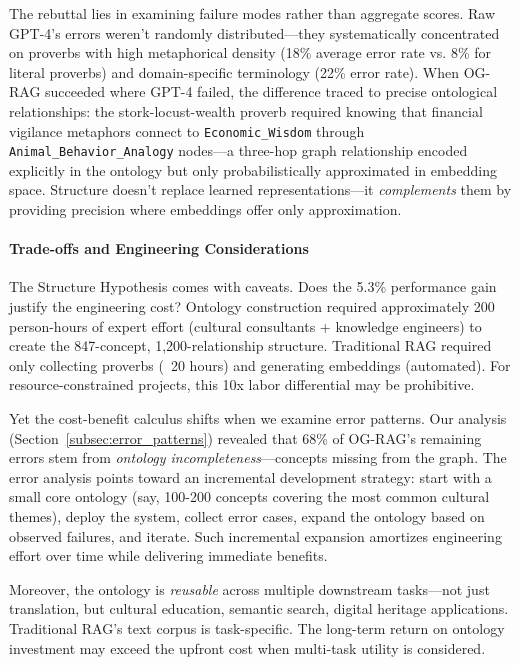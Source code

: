 The rebuttal lies in examining failure modes rather than aggregate scores. Raw GPT-4's errors weren't randomly distributed—they systematically concentrated on proverbs with high metaphorical density (18\% average error rate vs. 8\% for literal proverbs) and domain-specific terminology (22\% error rate). When OG-RAG succeeded where GPT-4 failed, the difference traced to precise ontological relationships: the stork-locust-wealth proverb required knowing that financial vigilance metaphors connect to \texttt{Economic\_Wisdom} through \texttt{Animal\_Behavior\_Analogy} nodes—a three-hop graph relationship encoded explicitly in the ontology but only probabilistically approximated in embedding space. Structure doesn't replace learned representations—it \emph{complements} them by providing precision where embeddings offer only approximation.

\paragraph{Trade-offs and Engineering Considerations}

The Structure Hypothesis comes with caveats. Does the 5.3\% performance gain justify the engineering cost? Ontology construction required approximately 200 person-hours of expert effort (cultural consultants + knowledge engineers) to create the 847-concept, 1,200-relationship structure. Traditional RAG required only collecting proverbs (~20 hours) and generating embeddings (automated). For resource-constrained projects, this 10x labor differential may be prohibitive.

Yet the cost-benefit calculus shifts when we examine error patterns. Our analysis (Section~\ref{subsec:error_patterns}) revealed that 68\% of OG-RAG's remaining errors stem from \emph{ontology incompleteness}—concepts missing from the graph. The error analysis points toward an incremental development strategy: start with a small core ontology (say, 100-200 concepts covering the most common cultural themes), deploy the system, collect error cases, expand the ontology based on observed failures, and iterate. Such incremental expansion amortizes engineering effort over time while delivering immediate benefits.

Moreover, the ontology is \emph{reusable} across multiple downstream tasks—not just translation, but cultural education, semantic search, digital heritage applications. Traditional RAG's text corpus is task-specific. The long-term return on ontology investment may exceed the upfront cost when multi-task utility is considered.

